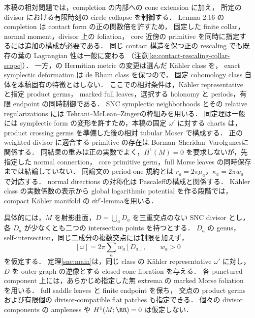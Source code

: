 本稿の相対問題では，completion の内部への cone extension に加え，
所定の divisor における有限時刻の circle collapse を制御する．
Lemma 2.16 の completion は contact form の正の関数倍を許すため，
固定した finite collar，normal moment，divisor 上の foliation，
core 近傍の primitive を同時に指定するには追加の構成が必要である．
同じ contact 構造を保つ正の rescaling でも既存の葉の Lagrangian 性は一般に変わる
（注意\ref{ke:contact-rescaling-collar-scope}）．
一方，\cite[\S\S2.3--2.4]{EM}の Hermitian metric の変更は選んだ Kähler class を，
exact symplectic deformation は de Rham class を保つので，
固定 cohomology class 自体を本稿固有の特徴とはしない．
ここでの相対条件は，Kähler representative と指定 product germs，
marked full leaves，選択する holonomy と periods，有限 endpoint の同時制御である．
SNC symplectic neighborhoods とその relative regularizations には
Tehrani--McLean--Zinger\cite[Definitions 2.11--2.12, Theorem 2.13]{TMZ}の枠組みを用いる．
同定理は一般には symplectic form の変形を許すため，本稿の固定 $\omega'$ に対する
charts は，product crossing germs を準備した後の相対 tubular Moser で構成する．
正の weighted divisor に適合する primitive の存在は
Borman--Sheridan--Varolgunes\cite[Propositions 2.7, 2.10]{BSV}に関係する．
同結果の重みは正の実数でよく，$H^1(M)=0$ を要求しないが，先指定した normal connection，
core primitive germ，full Morse leaves の同時保存までは結論していない．
同論文の period-one 規約とは $r_a=2\pi\mu_a$，$\kappa_a=2\pi w_a$ で対応する．
normal directions の対称化は Pascaleff\cite[\S4.2]{Pascaleff}の構成と関係する．
Kähler class の実数係数の表示から global logarithmic potential を作る段階では，
compact Kähler manifold の $\dd\dd^c$-lemma\cite[\S5]{DGMS}を用いる．

具体的には，$M$ を射影曲面，$D=\bigcup_aD_a$ を三重交点のない SNC divisor とし，
各 $D_a$ が少なくとも二つの intersection points を持つとする．
$D_a$ の genus，self-intersection，同じ二成分の複数交点には制限を加えず，
\[
 [\omega]=2\pi\sum_a w_a[D_a],\qquad w_a>0
\]
を仮定する．
定理\ref{snc:main}は，同じ class の Kähler representative $\omega'$ に対し，
$D$ を outer graph の逆像とする closed-cone fibration を与える．
各 punctured component 上には，あらかじめ指定した無 extrema の
marked Morse foliation を用いる．
full saddle leaves と finite endpoint を保ち，
交点の product germs および有限個の divisor-compatible flat patches も指定できる．
個々の divisor components の ampleness や $H^1(M;\RR)=0$ は仮定しない．

